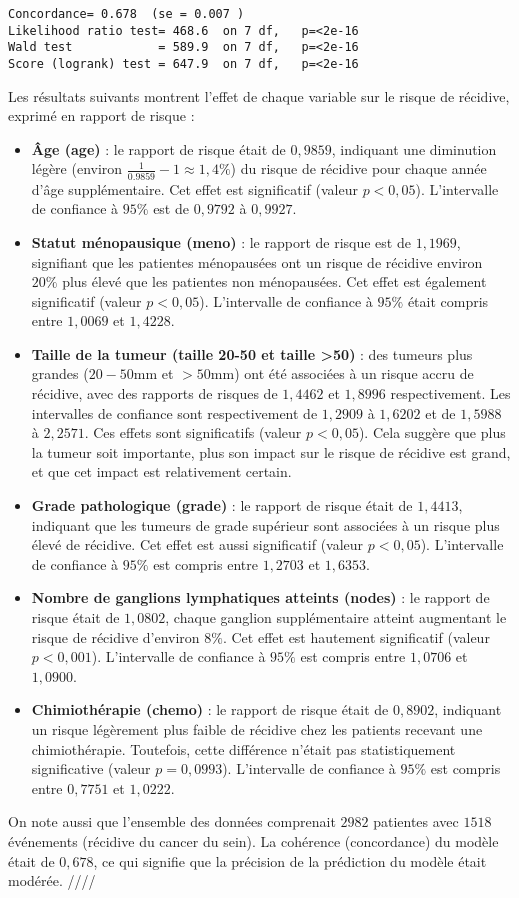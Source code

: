 \documentclass[../main.tex]{subfiles}
\begin{document}
\begin{CJK*}{UTF8}{gbsn}
\begin{lstlisting}
Concordance= 0.678  (se = 0.007 )
Likelihood ratio test= 468.6  on 7 df,   p=<2e-16
Wald test            = 589.9  on 7 df,   p=<2e-16
Score (logrank) test = 647.9  on 7 df,   p=<2e-16
\end{lstlisting}

Les résultats suivants montrent l'effet de chaque variable sur le risque de récidive, 
exprimé en rapport de risque :

\begin{itemize}
    \item \textbf{Âge (age)} : le rapport de risque était de $0,9859$, 
indiquant une diminution légère (environ $\frac{1}{0.9859} - 1 \approx 1,4\%$) du risque de récidive 
pour chaque année d'âge supplémentaire. Cet effet est significatif 
(valeur \( p < 0,05 \)). L'intervalle de confiance à $95 \%$ est de $0,9792$ à $0,9927$.
    \item \textbf{Statut ménopausique (meno)} : 
le rapport de risque est de $1,1969$, signifiant 
que les patientes ménopausées ont un risque de récidive environ 
$20\%$ plus élevé que les patientes non ménopausées. 
Cet effet est également significatif (valeur \( p < 0,05 \)). 
L'intervalle de confiance à $95 \%$ était compris entre $1,0069$ et $1,4228$.
    \item \textbf{Taille de la tumeur (taille 20-50 et taille >50)} : 
des tumeurs plus grandes ($20-50 \text{mm}$ et $> 50 \text{mm}$) 
ont été associées à un risque accru de récidive, 
avec des rapports de risques de $1,4462$ et $1,8996$ respectivement. 
Les intervalles de confiance sont respectivement de $1,2909$ à $1,6202$ et de $1,5988$ à $2,2571$. 
Ces effets sont significatifs (valeur \( p < 0,05 \)). 
Cela suggère que plus la tumeur soit importante, 
plus son impact sur le risque de récidive est grand, 
et que cet impact est relativement certain.
    \item \textbf{Grade pathologique (grade)} : 
le rapport de risque était de $1,4413$, 
indiquant que les tumeurs de grade supérieur 
sont associées à un risque plus élevé de récidive. 
Cet effet est aussi significatif (valeur \( p < 0,05 \)). 
L'intervalle de confiance à $95 \%$ est compris entre $1,2703$ et $1,6353$.
    \item \textbf{Nombre de ganglions lymphatiques atteints (nodes)} : 
le rapport de risque était de $1,0802$, 
chaque ganglion supplémentaire atteint augmentant le risque de récidive d'environ $8\%$. 
Cet effet est hautement significatif (valeur \( p < 0,001 \)). 
L'intervalle de confiance à $95 \%$ est compris entre $1,0706$ et $1,0900$.
    \item \textbf{Chimiothérapie (chemo)} : 
le rapport de risque était de $0,8902$, 
indiquant un risque légèrement plus faible de récidive 
chez les patients recevant une chimiothérapie. 
Toutefois, cette différence n'était pas statistiquement significative (valeur \( p = 0,0993 \)). 
L'intervalle de confiance à $95 \%$ est compris entre $0,7751$ et $1,0222$.
\end{itemize}

On note aussi que l'ensemble des données comprenait $2982$ patientes avec $1518$ événements 
(récidive du cancer du sein). La cohérence (concordance) du modèle était de $0,678$, 
ce qui signifie que la précision de la prédiction du modèle était modérée. ////
\end{CJK*}
\end{document}

